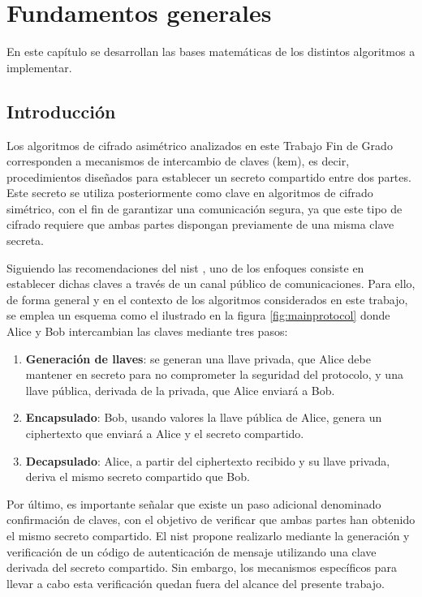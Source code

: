 \chapter{Fundamentos generales}
En este capítulo se desarrollan las bases matemáticas de los distintos algoritmos a implementar.
\section{Introducción}
Los algoritmos de cifrado asimétrico analizados en este Trabajo Fin de Grado corresponden a mecanismos de intercambio de claves (\gls{kem}), es decir, procedimientos diseñados para establecer un secreto compartido entre dos partes. Este secreto se utiliza posteriormente como clave en algoritmos de cifrado simétrico, con el fin de garantizar una comunicación segura, ya que este tipo de cifrado requiere que ambas partes dispongan previamente de una misma clave secreta.
\newline

Siguiendo las recomendaciones del \gls{nist} \cite{NIST_SP_800_227_ipd_2025}, uno de los enfoques consiste en establecer dichas claves a través de un canal público de comunicaciones. Para ello, de forma general y en el contexto de los algoritmos considerados en este trabajo, se emplea un esquema como el ilustrado en la figura \ref{fig:mainprotocol} donde Alice y Bob intercambian las claves mediante tres pasos:
\begin{enumerate}
	\item \textbf{Generación de llaves}: se generan una llave privada, que Alice debe mantener en secreto para no comprometer la seguridad del protocolo, y una llave pública, derivada de la privada, que Alice enviará a Bob.
	\item \textbf{Encapsulado}: Bob, usando valores la llave pública de Alice, genera un ciphertexto que enviará a Alice y el secreto compartido.
	\item \textbf{Decapsulado}: Alice, a partir del ciphertexto recibido y su llave privada, deriva el mismo secreto compartido que Bob.
\end{enumerate}


Por último, es importante señalar que existe un paso adicional denominado confirmación de claves, con el objetivo de verificar que ambas partes han obtenido el mismo secreto compartido. El \gls{nist} propone realizarlo mediante la generación y verificación de un código de autenticación de mensaje utilizando una clave derivada del secreto compartido. Sin embargo, los mecanismos específicos para llevar a cabo esta verificación quedan fuera del alcance del presente trabajo.
\newpage

